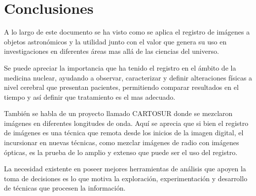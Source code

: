 \section{Conclusiones}

A lo largo de este documento se ha visto como se aplica el registro de
imágenes a objetos astronómicos y la utilidad junto con el valor que
genera su uso en investigaciones en diferentes áreas mas allá de las
ciencias del universo.

Se puede apreciar la importancia que ha tenido el registro en el
ámbito de la medicina nuclear, ayudando a observar, caracterizar y
definir alteraciones físicas a nivel cerebral que presentan pacientes,
permitiendo comparar resultados en el tiempo y así definir que
tratamiento es el mas adecuado.

También se habla de un proyecto llamado CARTOSUR donde se mezclaron
imágenes en diferentes longitudes de onda. Aquí se aprecia que si bien
el registro de imágenes es una técnica que remota desde los inicios de
la imagen digital, el incursionar en nuevas técnicas, como mezclar
imágenes de radio con imágenes ópticas, es la prueba de lo amplio y
extenso que puede ser el uso del registro.

La necesidad existente en poseer mejores herramientas de análisis que
apoyen la toma de decisiones es lo que motiva la exploración,
experimentación y desarrollo de técnicas que procesen la información.

